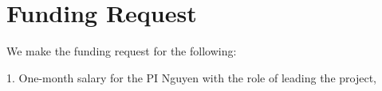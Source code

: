\section{Funding Request}

We make the funding request for the following:

1. One-month salary for the PI Nguyen with the role of leading the
project, 
